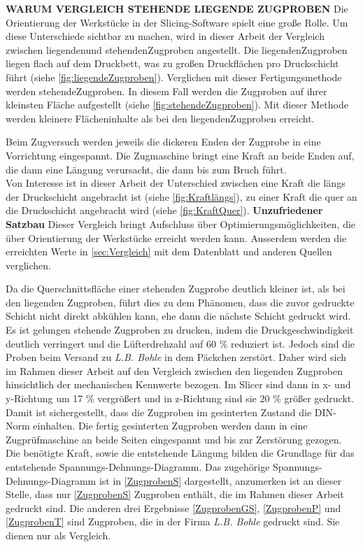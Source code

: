 \textbf{WARUM VERGLEICH STEHENDE LIEGENDE ZUGPROBEN}
Die Orientierung der Werkstücke in der Slicing-Software spielt eine große Rolle. Um diese Unterschiede sichtbar zu machen, wird in dieser Arbeit der Vergleich zwischen \glqq liegenden\grqq und \glqq stehenden\grqq Zugproben angestellt. Die \glqq liegenden\grqq Zugproben liegen flach auf dem Druckbett, was zu großen Druckflächen pro Druckschicht führt (siehe \autoref{fig:liegendeZugproben}). Verglichen mit dieser Fertigungsmethode werden \glqq stehende\grqq Zugproben. In diesem Fall werden die Zugproben auf ihrer kleinsten Fläche aufgestellt (siehe \autoref{fig:stehendeZugproben}). Mit dieser Methode werden kleinere Flächeninhalte als bei den \glqq liegenden\grqq Zugproben erreicht.

Beim Zugversuch werden jeweils die dickeren Enden der Zugprobe in eine Vorrichtung eingespannt. Die Zugmaschine bringt eine Kraft an beide Enden auf, die dann eine Längung verursacht, die dann bis zum Bruch führt.\\
Von Interesse ist in dieser Arbeit der Unterschied zwischen eine Kraft die längs der Druckschicht angebracht ist (siehe \autoref{fig:Kraftlängs}), zu einer Kraft die quer an die Druckschicht angebracht wird (siehe \autoref{fig:KraftQuer}). \textbf{Unzufriedener Satzbau}
Dieser Vergleich bringt Aufschluss über Optimierungsmöglichkeiten, die über Orientierung der Werkstücke erreicht werden kann. Ausserdem werden die erreichten Werte in \autoref{sec:Vergleich} mit dem Datenblatt und anderen Quellen verglichen.

Da die Querschnittsfläche einer stehenden Zugprobe deutlich kleiner ist, als bei den liegenden Zugproben, führt dies zu dem Phänomen, dass die zuvor gedruckte Schicht nicht direkt abkühlen kann, ehe dann die nächste Schicht gedruckt wird. Es ist gelungen stehende Zugproben zu drucken, indem die Druckgeschwindigkeit deutlich verringert und die Lüfterdrehzahl auf 60 \% reduziert ist. Jedoch sind die Proben beim Versand zu \textit{L.B. Bohle} in dem Päckchen zerstört. Daher wird sich im Rahmen dieser Arbeit auf den Vergleich zwischen den liegenden Zugproben hinsichtlich der mechanischen Kennwerte bezogen.
Im Slicer sind dann in x- und y-Richtung um 17 \% vergrößert und in z-Richtung sind sie 20 \% größer gedruckt. Damit ist sichergestellt, dass die Zugproben im gesinterten Zustand die DIN-Norm einhalten. Die fertig gesinterten Zugproben werden dann in eine Zugprüfmaschine an beide Seiten eingespannt und bis zur Zerstörung gezogen. Die benötigte Kraft, sowie die entstehende Längung bilden die Grundlage für das entstehende Spannungs-Dehnungs-Diagramm.
Das zugehörige Spannungs-Dehnungs-Diagramm ist in \autoref{ZugprobenS} dargestellt, anzumerken ist an dieser Stelle, dass nur \autoref{ZugprobenS} Zugproben enthält, die im Rahmen dieser Arbeit gedruckt sind. Die anderen drei Ergebnisse \autoref{ZugprobenGS}, \autoref{ZugprobenP} und \autoref{ZugprobenT} sind Zugproben, die in der Firma \textit{L.B. Bohle} gedruckt sind. Sie dienen nur als Vergleich.
 
